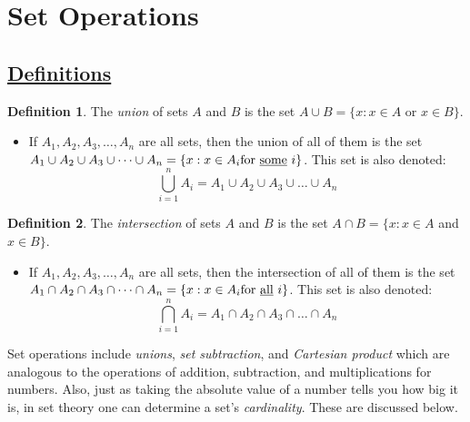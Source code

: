 \documentclass{amsart} %
\theoremstyle{definition} %
\newtheorem*{dfn}{Definition} %
\theoremstyle{proposition} %
\theoremstyle{remark} %
\begin{document}
\bigskip \bigskip \bigskip \bigskip

\section{\textbf{Set Operations}}

\subsection{\underline{Definitions}}

\begin{dfn}
      \boxed{\cup} \quad The \emph{union} of sets $A$ and $B$ is the set $A \cup B = \{x : x \in A$ or $x \in B \}$.
            \begin{itemize}
                  \item If $A_1, A_2, A_3, \dots, A_n$ are all sets, then the union of all of them is the set $A_1 \cup A_2 \cup A_3 \cup \dots \cup A_n = \{x : x \in A_i \text{for \underline{some}}\ i \} $. This set is also denoted:
                        \[\bigcup^n_{i=1}A_i = A_1 \cup A_2 \cup A_3 \cup \dots \cup A_n \]
            \end{itemize}
\end{dfn}

\begin{dfn}
      \boxed{\cap} \quad The \emph{intersection} of sets $A$ and $B$ is the set $A \cap B = \{x : x \in A$ and $x \in B \}$.
            \begin{itemize}
                  \item If $A_1, A_2, A_3, \dots, A_n$ are all sets, then the intersection of all of them is the set $A_1 \cap A_2 \cap A_3 \cap \dots \cap A_n = \{x : x \in A_i \text{for \underline{all}}\ i \} $. This set is also denoted:
                        \[\bigcap^n_{i=1}A_i = A_1 \cap A_2 \cap A_3 \cap \dots \cap A_n \]
            \end{itemize}
\end{dfn}


Set operations include \emph{unions}, \emph{set subtraction}, and \emph{Cartesian product} which are analogous to the operations of addition, subtraction, and multiplications for numbers. Also, just as taking the absolute value of a number tells you how big it is, in set theory one can determine a set's \emph{cardinality}. These are discussed below. \\
\end{document}
